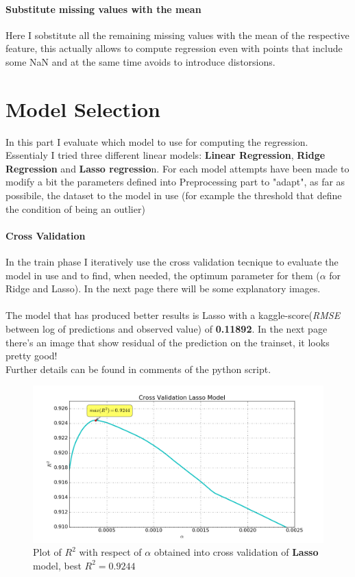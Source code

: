\documentclass[a4paper, 11pt]{article}
\begin{document}
\paragraph{Substitute missing values with the mean}
Here I sobstitute all the remaining missing values with the mean of the respective feature, this actually allows to compute regression even with points that include some NaN and at the same time avoids to introduce distorsions. 

\section{Model Selection}
In this part I evaluate which model to use for computing the regression. Essentialy I tried three different linear models: \textbf{Linear Regression}, \textbf{Ridge Regression} and \textbf{Lasso regressio}n. For each model attempts have been made to modify a bit the parameters defined into Preprocessing part to "adapt", as far as possibile, the dataset to  the model in use (for example the threshold that define the condition of being  an outlier)
\paragraph{Cross Validation}
In the train phase I iteratively use the cross validation tecnique to evaluate the model in use and to find, when needed, the optimum parameter for them ($\alpha$ for Ridge and Lasso). In the next page there will be some explanatory images.
\\ \\
The model that has produced better results is Lasso with a kaggle-score(\emph{RMSE} between log of predictions and observed value) of \textbf{0.11892}. In the next page there's an image that show residual of the prediction on the trainset, it looks pretty good! 
\\Further details can be found in comments of the python script.

\begin{figure}[t]
\caption{Plot of $R^2$ with respect of $\alpha$ obtained into cross validation of \textbf{Lasso} model, best $R^2 = 0.9244$}
\includegraphics[width=20cm]{r2lasso.png}
\centering
\end{figure}
\end{document}
